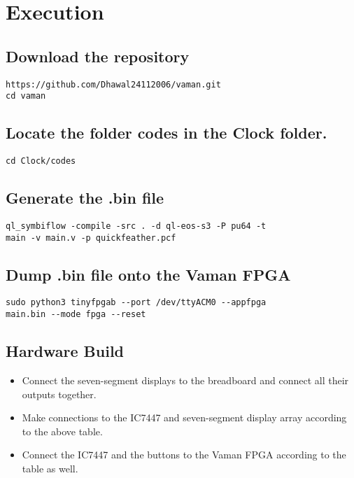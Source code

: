 \section{Execution}
\subsection{Download the repository}
\begin{lstlisting}
https://github.com/Dhawal24112006/vaman.git
cd vaman
\end{lstlisting}

\subsection{Locate the folder codes in the Clock folder.}
\begin{lstlisting}
cd Clock/codes
\end{lstlisting}

\subsection{Generate the .bin file}
\begin{footnotesize}
\begin{lstlisting}
ql_symbiflow -compile -src . -d ql-eos-s3 -P pu64 -t
main -v main.v -p quickfeather.pcf
\end{lstlisting}
\end{footnotesize}

\subsection{Dump .bin file onto the Vaman FPGA}
\begin{footnotesize}
\begin{lstlisting}
sudo python3 tinyfpgab --port /dev/ttyACM0 --appfpga
main.bin --mode fpga --reset
\end{lstlisting}
\end{footnotesize}

\subsection{Hardware Build}
\begin{itemize}
    \item Connect the seven-segment displays to the breadboard and connect all their outputs together.
    \item Make connections to the IC7447 and seven-segment display array according to the above table.
    \item Connect the IC7447 and the buttons to the Vaman FPGA according to the table as well.
\end{itemize}
